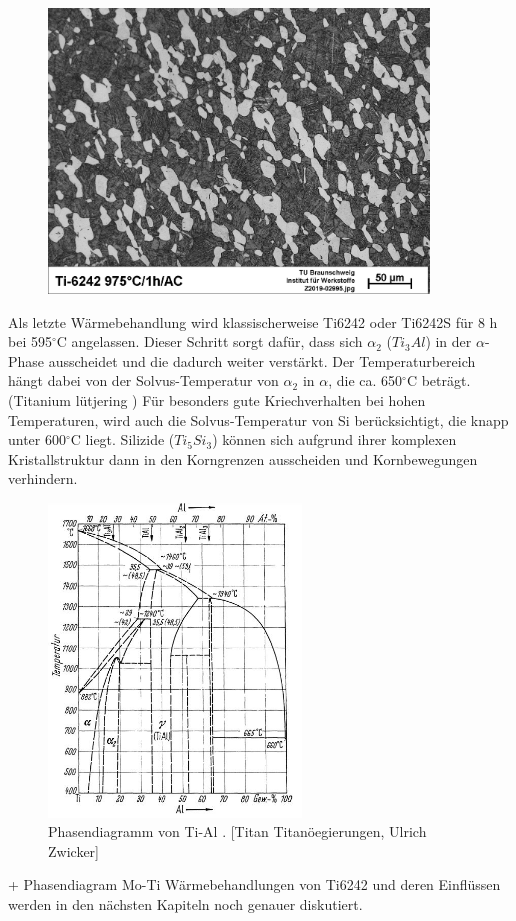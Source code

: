\begin{figure}[H]
	\centering
	\includegraphics[width=0.9\textwidth]{Bilder/LM-975-1h-AC}
	\caption{}
	\label{L.M}
\end{figure}


Als letzte Wärmebehandlung wird klassischerweise  Ti6242 oder Ti6242S für  8 h bei 595$^\circ$C angelassen. Dieser Schritt sorgt dafür, dass sich $\alpha_2$ ($Ti_3Al$) in der $\alpha$-Phase ausscheidet und die dadurch weiter verstärkt. Der Temperaturbereich hängt dabei von der Solvus-Temperatur von $\alpha_2$ in $\alpha$, die ca. 650$^\circ$C beträgt.(Titanium lütjering )
Für besonders gute Kriechverhalten bei hohen Temperaturen, wird auch die Solvus-Temperatur von Si berücksichtigt, die knapp unter 600$^\circ$C liegt. Silizide ($Ti_5Si_3$) können sich aufgrund ihrer komplexen Kristallstruktur dann in den Korngrenzen ausscheiden und Kornbewegungen verhindern.


\begin{figure}[H]
	\centering
	\includegraphics[width=0.6\textwidth]{Bilder/TiAl}
	\caption{Phasendiagramm von Ti-Al . [Titan Titanöegierungen, Ulrich Zwicker]}
\end{figure}
+ Phasendiagram Mo-Ti
Wärmebehandlungen von Ti6242 und deren Einflüssen werden in den nächsten Kapiteln noch genauer diskutiert.


